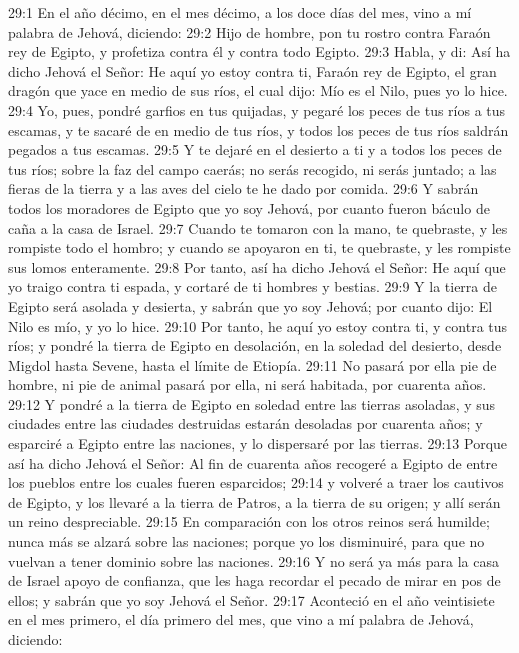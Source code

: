 29:1 En el año décimo, en el mes décimo, a los doce días del mes, vino a mí palabra de Jehová, diciendo:   
29:2 Hijo de hombre, pon tu rostro contra Faraón rey de Egipto, y profetiza contra él y contra todo Egipto.   
29:3 Habla, y di: Así ha dicho Jehová el Señor: He aquí yo estoy contra ti, Faraón rey de Egipto, el gran dragón que yace en medio de sus ríos, el cual dijo: Mío es el Nilo, pues yo lo hice.   
29:4 Yo, pues, pondré garfios en tus quijadas, y pegaré los peces de tus ríos a tus escamas, y te sacaré de en medio de tus ríos, y todos los peces de tus ríos saldrán pegados a tus escamas.   
29:5 Y te dejaré en el desierto a ti y a todos los peces de tus ríos; sobre la faz del campo caerás; no serás recogido, ni serás juntado; a las fieras de la tierra y a las aves del cielo te he dado por comida.   
29:6 Y sabrán todos los moradores de Egipto que yo soy Jehová, por cuanto fueron báculo de caña a la casa de Israel.   
29:7 Cuando te tomaron con la mano, te quebraste, y les rompiste todo el hombro; y cuando se apoyaron en ti, te quebraste, y les rompiste sus lomos enteramente.   
29:8 Por tanto, así ha dicho Jehová el Señor: He aquí que yo traigo contra ti espada, y cortaré de ti hombres y bestias.   
29:9 Y la tierra de Egipto será asolada y desierta, y sabrán que yo soy Jehová; por cuanto dijo: El Nilo es mío, y yo lo hice. 
29:10 Por tanto, he aquí yo estoy contra ti, y contra tus ríos; y pondré la tierra de Egipto en desolación, en la soledad del desierto, desde Migdol hasta Sevene, hasta el límite de Etiopía.   
29:11 No pasará por ella pie de hombre, ni pie de animal pasará por ella, ni será habitada, por cuarenta años.   
29:12 Y pondré a la tierra de Egipto en soledad entre las tierras asoladas, y sus ciudades entre las ciudades destruidas estarán desoladas por cuarenta años; y esparciré a Egipto entre las naciones, y lo dispersaré por las tierras.   
29:13 Porque así ha dicho Jehová el Señor: Al fin de cuarenta años recogeré a Egipto de entre los pueblos entre los cuales fueren esparcidos;   
29:14 y volveré a traer los cautivos de Egipto, y los llevaré a la tierra de Patros, a la tierra de su origen; y allí serán un reino despreciable.   
29:15 En comparación con los otros reinos será humilde; nunca más se alzará sobre las naciones; porque yo los disminuiré, para que no vuelvan a tener dominio sobre las naciones.   
29:16 Y no será ya más para la casa de Israel apoyo de confianza, que les haga recordar el pecado de mirar en pos de ellos; y sabrán que yo soy Jehová el Señor.   
29:17 Aconteció en el año veintisiete en el mes primero, el día primero del mes, que vino a mí palabra de Jehová, diciendo:   
